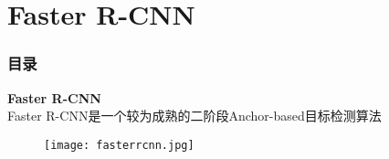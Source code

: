 \section{Faster R-CNN}
\begin{frame}[allowframebreaks]
    \frametitle{\textsc{目录}} \vspace{-0.3cm}
    \begin{spacing}{0.0}
    \end{spacing}   %
\end{frame}

\begin{frame}
    \vspace{0.5em}
    \noindent\large\textbf{Faster R-CNN}\\
    \vspace{0.5em}
    Faster R-CNN是一个较为成熟的二阶段Anchor-based目标检测算法\\
    \vspace{0.5em}
    \begin{figure}
        \texttt{[image: fasterrcnn.jpg]}
    \end{figure}
\end{frame}

